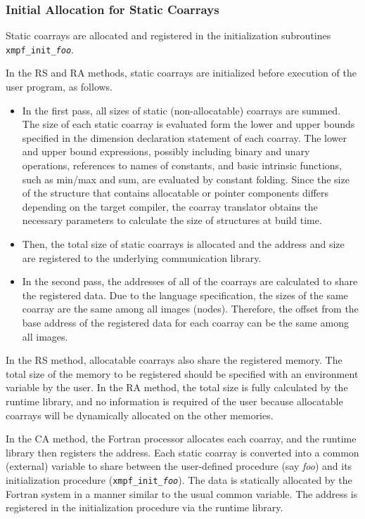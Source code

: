 %
%


\subsubsection{Initial Allocation for Static Coarrays}

Static coarrays are allocated and registered in the initialization subroutines 
{\tt xmpf\_init\_{\it foo}}. 

In the RS and RA methods, static coarrays are initialized before execution of the user program,
as follows.
\begin{itemize}
\item
In the first pass, all sizes of static (non-allocatable) coarrays are summed.
The size of each static coarray is evaluated form the lower and upper bounds
specified in the dimension declaration statement of each coarray.
The lower and upper bound expressions, possibly including binary and unary
operations, references to names of constants, and basic intrinsic functions, 
such as min/max and sum, are evaluated by constant folding.
Since the size of the structure that contains allocatable or pointer 
components differs depending on the target compiler, the coarray translator
obtains the necessary parameters to calculate the size of structures at build time.
\item
Then, the total size of static coarrays is allocated and the address
and size are registered to the underlying communication library.
\item
In the second pass, the addresses of all of the coarrays are calculated to share
the registered data.
Due to the language specification, the sizes of the same coarray are the same 
among all images (nodes). Therefore, the offset from the base address of the registered 
data for each coarray can be the same among all images.
\end{itemize}
%
In the RS method, allocatable coarrays also share the registered memory. 
The total size of the memory to be registered
should be specified with an environment variable by the user.
In the RA method, the total size is fully calculated by the runtime 
library, and no information is required of the user because allocatable coarrays
will be dynamically allocated on the other memories.

In the CA method,
the Fortran processor allocates each coarray, and the runtime library
then registers the address.
Each static coarray is converted into a common (external) variable to share 
between the user-defined procedure (say {\it foo}) and its initialization
procedure ({\tt xmpf\_init\_{\it foo}}). The data is statically allocated
by the Fortran system in a manner similar to the usual common variable.
The address is registered in the initialization procedure via the runtime library.

